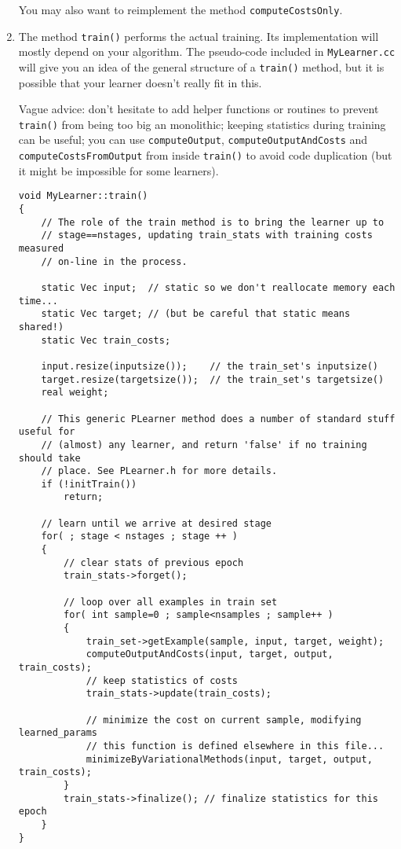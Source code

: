 \documentclass[11pt]{book}
\begin{document}
\begin{enumerate}
You may also want to reimplement the method {\tt computeCostsOnly}.

\item The method {\tt train()} performs the actual training. Its
implementation will mostly depend on your algorithm. The pseudo-code
included in {\tt MyLearner.cc} will give you an idea of the general
structure of a {\tt train()} method, but it is possible that your
learner doesn't really fit in this.

Vague advice: don't hesitate to add helper functions or routines
to prevent {\tt train()} from being too big an monolithic;
keeping statistics during training can be useful; you can use
{\tt computeOutput}, {\tt computeOutputAndCosts} and {\tt
computeCostsFromOutput} from inside {\tt train()} to
avoid code duplication (but it might be impossible for some learners).

\begin{verbatim}
void MyLearner::train()
{
    // The role of the train method is to bring the learner up to
    // stage==nstages, updating train_stats with training costs measured
    // on-line in the process.

    static Vec input;  // static so we don't reallocate memory each time...
    static Vec target; // (but be careful that static means shared!)
    static Vec train_costs;

    input.resize(inputsize());    // the train_set's inputsize()
    target.resize(targetsize());  // the train_set's targetsize()
    real weight;

    // This generic PLearner method does a number of standard stuff useful for
    // (almost) any learner, and return 'false' if no training should take
    // place. See PLearner.h for more details.
    if (!initTrain())
        return;

    // learn until we arrive at desired stage
    for( ; stage < nstages ; stage ++ )
    {
        // clear stats of previous epoch
        train_stats->forget();

        // loop over all examples in train set
        for( int sample=0 ; sample<nsamples ; sample++ )
        {
            train_set->getExample(sample, input, target, weight);
            computeOutputAndCosts(input, target, output, train_costs);
            // keep statistics of costs
            train_stats->update(train_costs);

            // minimize the cost on current sample, modifying learned_params
            // this function is defined elsewhere in this file...
            minimizeByVariationalMethods(input, target, output, train_costs);
        }
        train_stats->finalize(); // finalize statistics for this epoch
    }
}
\end{verbatim}


\end{enumerate}
\end{document}
